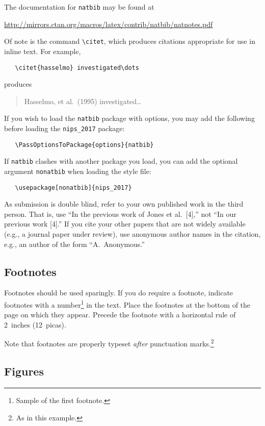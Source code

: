 \documentclass[final]{article}
\begin{document}
\begin{itemize}
The documentation for \verb+natbib+ may be found at
\begin{center}
  \url{http://mirrors.ctan.org/macros/latex/contrib/natbib/natnotes.pdf}
\end{center}
Of note is the command \verb+\citet+, which produces citations
appropriate for use in inline text.  For example,
\begin{verbatim}
   \citet{hasselmo} investigated\dots
\end{verbatim}
produces
\begin{quote}
  Hasselmo, et al.\ (1995) investigated\dots
\end{quote}

If you wish to load the \verb+natbib+ package with options, you may
add the following before loading the \verb+nips_2017+ package:
\begin{verbatim}
   \PassOptionsToPackage{options}{natbib}
\end{verbatim}

If \verb+natbib+ clashes with another package you load, you can add
the optional argument \verb+nonatbib+ when loading the style file:
\begin{verbatim}
   \usepackage[nonatbib]{nips_2017}
\end{verbatim}

As submission is double blind, refer to your own published work in the
third person. That is, use ``In the previous work of Jones et
al.\ [4],'' not ``In our previous work [4].'' If you cite your other
papers that are not widely available (e.g., a journal paper under
review), use anonymous author names in the citation, e.g., an author
of the form ``A.\ Anonymous.''

\subsection{Footnotes}

Footnotes should be used sparingly.  If you do require a footnote,
indicate footnotes with a number\footnote{Sample of the first
  footnote.} in the text. Place the footnotes at the bottom of the
page on which they appear.  Precede the footnote with a horizontal
rule of 2~inches (12~picas).

Note that footnotes are properly typeset \emph{after} punctuation
marks.\footnote{As in this example.}

\subsection{Figures}


\end{itemize}
\end{document}
